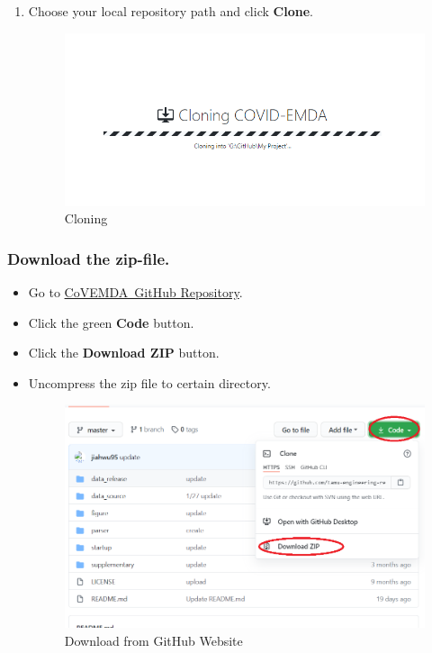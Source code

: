 \documentclass[11pt]{article}
\newcommand{\covemda}{CoVEMDA}
\newcommand{\covemdagithuburl}{https://github.com/tamu-engineering-research/COVID-EMDA}
\numberwithin{equation}{section}
\numberwithin{table}{section}
\numberwithin{figure}{section}
\begin{document}
\begin{itemize}
\begin{enumerate}
            \item Choose your local repository path and click \textbf{Clone}.
            \begin{figure}[htbp]
                \centering
                \caption{Cloning}
                \includegraphics[width=.7\textwidth]{figures/github_desktop_step_3.png}
            \end{figure}
        \end{enumerate}
        
    \end{itemize} 
\subsubsection{Download the zip-file.}
    \begin{itemize}
        \item Go to \href{\covemdagithuburl}{\covemda~GitHub Repository}.
        \item Click the green \textbf{Code} button.
        \item Click the \textbf{Download ZIP} button.
        \item Uncompress the zip file to certain directory.
        \begin{figure}[htbp]
            \centering
            \caption{Download from GitHub Website}
            \includegraphics{figures/github_website_step_1.png}
        \end{figure}
    \end{itemize}
\end{document}
